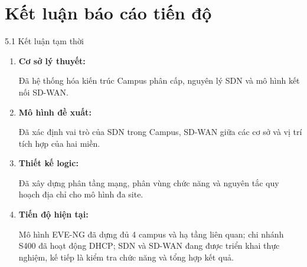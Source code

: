 
\section{Kết luận báo cáo tiến độ}

\begin{frame}{5.1 Kết luận tạm thời}
    \begin{enumerate}
        \item \textbf{Cơ sở lý thuyết:}
        \par Đã hệ thống hóa kiến trúc Campus phân cấp, nguyên lý SDN và mô hình kết nối SD-WAN.
        \vspace{0.18cm}
        \item \textbf{Mô hình đề xuất:}
        \par Đã xác định vai trò của SDN trong Campus, SD-WAN giữa các cơ sở và vị trí tích hợp của hai miền.
        \vspace{0.18cm}
        \item \textbf{Thiết kế logic:}
        \par Đã xây dựng phân tầng mạng, phân vùng chức năng và nguyên tắc quy hoạch địa chỉ cho mô hình đa site.
        \vspace{0.18cm}
        \item \textbf{Tiến độ hiện tại:}
        \par Mô hình EVE-NG đã dựng đủ 4 campus và hạ tầng liên quan; chi nhánh S400 đã hoạt động DHCP; SDN và SD-WAN đang được triển khai thực nghiệm, kế tiếp là kiểm tra chức năng và tổng hợp kết quả.
    \end{enumerate}
\end{frame}
